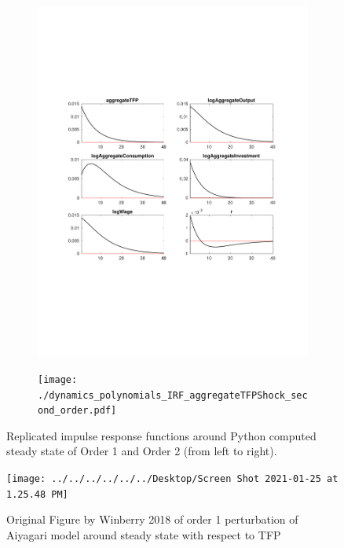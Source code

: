 \documentclass[11pt]{article}
\begin{document}
\begin{figure}[htp]
\begin{subfigure}{.5\textwidth}
\centering	
\includegraphics[scale=.33]{./order 1.pdf}
\end{subfigure}
\begin{subfigure}{.5\textwidth}
\centering
\texttt{[image: ./dynamics\_polynomials\_IRF\_aggregateTFPShock\_second\_order.pdf]}
\end{subfigure}
\caption{Replicated impulse response functions around Python computed steady state of Order 1 and Order 2 (from left to right).}
\label{IRF_rep}
\vspace*{\floatsep}
\centering
\texttt{[image: ../../../../../../Desktop/Screen Shot 2021-01-25 at 1.25.48 PM]}
\caption{Original Figure by Winberry 2018 of order 1 perturbation of Aiyagari model around steady state with respect to TFP}
\label{IRF_orig}
\end{figure}
\end{document}
